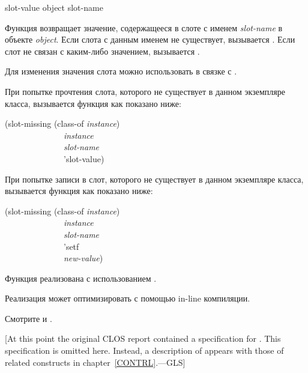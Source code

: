 \begin{defun}[Функция]
slot-value object slot-name

Функция  возвращает значение, содержащееся в слоте с именем
\emph{slot-name} в объекте \emph{object}. Если слота с данным именем не
существует, вызывается . Если слот не связан с каким-либо
значением, вызывается .

Для изменения значения слота можно использовать  в связке с
.

При попытке прочтения слота, которого не существует в данном экземпляре класса,
вызывается функция  как показано ниже:
\begin{lisp}
(slot-missing (class-of \emph{instance}) \\
~~~~~~~~~~~~~~\emph{instance} \\
~~~~~~~~~~~~~~\emph{slot-name} \\
~~~~~~~~~~~~~~'slot-value)
\end{lisp}

При попытке записи в слот, которого не существует в данном экземпляре класса,
вызывается функция  как показано ниже:
\begin{lisp}
(slot-missing (class-of \emph{instance}) \\
~~~~~~~~~~~~~~\emph{instance} \\
~~~~~~~~~~~~~~\emph{slot-name} \\
~~~~~~~~~~~~~~'setf \\
~~~~~~~~~~~~~~\emph{new-value})
\end{lisp}

Функция  реализована с использованием
.

Реализация может оптимизировать  с помощью in-line компиляции.

Смотрите  и .
\end{defun}

[At this point the original CLOS report \cite{SIGPLAN-CLOS,LASC-CLOS-PART-2}
contained a specification for .
This specification is omitted here.  Instead, a description
of  appears with those of related constructs in chapter~\ref{CONTRL}.---GLS]

